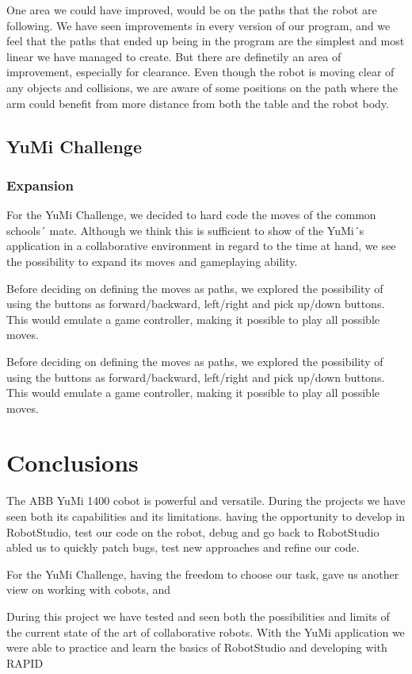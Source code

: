 \documentclass[a4paper,12pt]{article}
\begin{document}
One area we could have improved, would be on the paths that the robot are following. We have seen improvements in every version of our program, and we feel that the paths that ended up being in the program are the simplest and most linear we have managed to create. But there are definetily an area of improvement, especially for clearance. Even though the robot is moving clear of any objects and collisions, we are aware of some positions on the path where the arm could benefit from more distance from both the table and the robot body.

\subsection{YuMi Challenge}
\subsubsection{Expansion}
For the YuMi Challenge, we decided to hard code the moves of the common schools´ mate. Although we think this is sufficient to show of the YuMi´s application in a collaborative environment in regard to the time at hand, we see the possibility to expand its moves and gameplaying ability. 

Before deciding on defining the moves as paths, we explored the possibility of using the buttons as forward/backward, left/right and pick up/down buttons. This would emulate a game controller, making it possible to play all possible moves.  


Before deciding on defining the moves as paths, we explored the possibility of using the buttons as forward/backward, left/right and pick up/down buttons. This would emulate a game controller, making it possible to play all possible moves.  

\section{Conclusions} 
The ABB YuMi 1400 cobot is powerful and versatile. During the projects we have seen both its capabilities and its limitations. 
having the opportunity  to develop in RobotStudio, test our code on the robot, debug and go back to RobotStudio abled us to quickly patch bugs, test new approaches and refine our code. 

For the YuMi Challenge, having the freedom to choose our task, gave us another view on working with cobots, and 

During this project we have tested and seen both the possibilities and limits of the current state of the art of collaborative robots. With the YuMi application we were able to practice and learn the basics of RobotStudio and developing with RAPID
\nocite{*} %
\printbibliography
\end{document}
